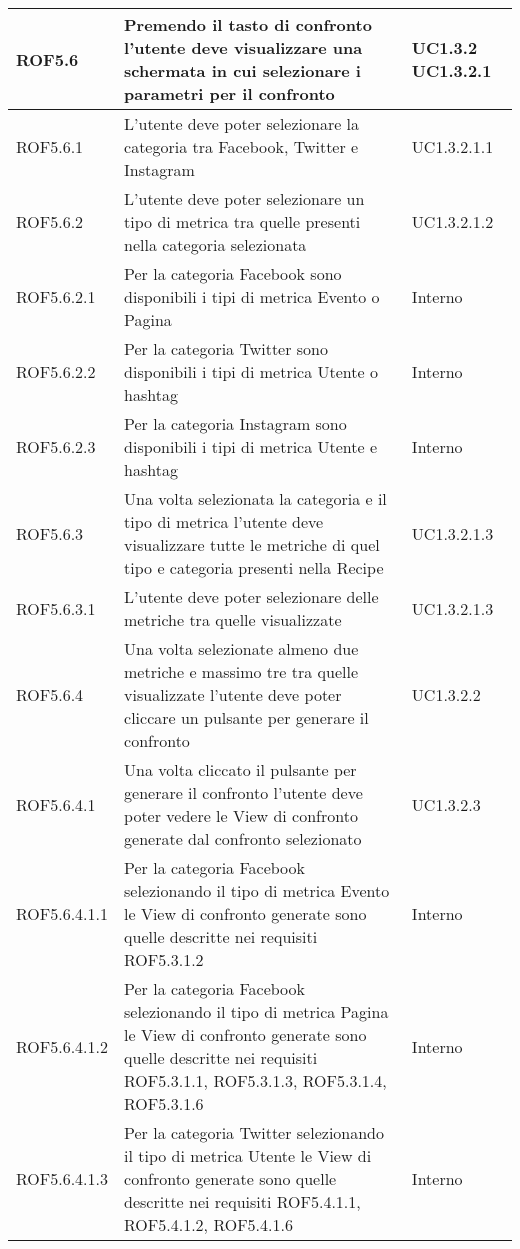 \begin{center}
\begin{longtable}{| p{2.5cm} | p{8cm} | p{2cm} |}

		ROF5.6  &  Premendo il tasto di confronto l'utente deve visualizzare una schermata in cui selezionare i parametri per il confronto  &  UC1.3.2 \newline UC1.3.2.1 \\
		\hline
		ROF5.6.1  &  L'utente deve poter selezionare la categoria tra Facebook, Twitter e Instagram  &  UC1.3.2.1.1 \\
		\hline
		ROF5.6.2  &  L'utente deve poter selezionare un tipo di metrica tra quelle presenti nella categoria selezionata  &  UC1.3.2.1.2 \\
		\hline
		ROF5.6.2.1  &  Per la categoria Facebook sono disponibili i tipi di metrica Evento o Pagina  &  Interno \\
		\hline
		ROF5.6.2.2  &  Per la categoria Twitter sono disponibili i tipi di metrica Utente o hashtag &  Interno \\
		\hline
		ROF5.6.2.3  &  Per la categoria Instagram sono disponibili i tipi di metrica Utente e hashtag   &  Interno \\
		\hline
		ROF5.6.3  &  Una volta selezionata la categoria e il tipo di metrica l'utente deve visualizzare tutte le metriche di quel tipo e categoria presenti nella Recipe &  UC1.3.2.1.3 \\
		\hline
		ROF5.6.3.1  &  L'utente deve poter selezionare delle metriche tra quelle visualizzate &  UC1.3.2.1.3 \\
		\hline
		ROF5.6.4  &  Una volta selezionate almeno due metriche e massimo tre tra quelle visualizzate l'utente deve poter cliccare un pulsante per generare il confronto  &  UC1.3.2.2 \\
		\hline
		ROF5.6.4.1  &  Una volta cliccato il pulsante per generare il confronto l'utente deve poter vedere le View di confronto generate dal confronto selezionato  &  UC1.3.2.3 \\
		\hline
		ROF5.6.4.1.1  &  Per la categoria Facebook selezionando il tipo di metrica Evento le View di confronto generate sono quelle descritte nei requisiti ROF5.3.1.2  &  Interno \\
		\hline
		ROF5.6.4.1.2  &  Per la categoria Facebook selezionando il tipo di metrica Pagina le View di confronto generate sono quelle descritte nei requisiti ROF5.3.1.1, ROF5.3.1.3, ROF5.3.1.4, ROF5.3.1.6 &  Interno \\
		\hline
		ROF5.6.4.1.3  &  Per la categoria Twitter selezionando il tipo di metrica Utente le View di confronto generate sono quelle descritte nei requisiti ROF5.4.1.1, ROF5.4.1.2, ROF5.4.1.6 &  Interno \\

\end{longtable}
\end{center}
